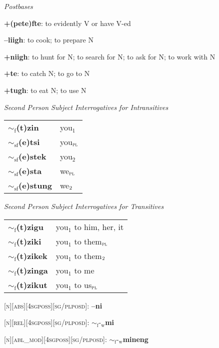 \documentclass{article}
\begin{document}
\textit{Postbases}
\begin{description}
\item \textbf{+(pete)fte}: to evidently V or have V-ed
\item \textbf{--liigh}: to cook; to prepare N
\item \textbf{+niigh}: to hunt for N; to search for N; to ask for N; to work with N
\item \textbf{+te}: to catch N; to go to N
\item \textbf{+tugh}: to eat N; to use N
\end{description}

\bigskip

\textit{Second Person Subject Interrogatives for Intransitives}

\begin{tabular}{ l l }
\textbf{$\sim_\text{f}$(t)zin} & you$_1$\\
\textbf{$\sim_\text{sf}$(e)tsi} & you$_\text{\textsc{pl}}$ \\
\textbf{$\sim_\text{sf}$(e)stek} & you$_2$ \\
\textbf{$\sim_\text{sf}$(e)sta} & we$_\text{\textsc{pl}}$ \\
\textbf{$\sim_\text{sf}$(e)stung} & we$_\text{\textsc{2}}$
\end{tabular}

\bigskip

\textit{Second Person Subject Interrogatives for Transitives}

\begin{tabular}{ l l }
\textbf{$\sim_\text{f}$(t)zigu} & you$_1$ to him, her, it\\
\textbf{$\sim_\text{f}$(t)ziki} & you$_1$ to them$_\text{\textsc{pl}}$ \\
\textbf{$\sim_\text{f}$(t)zikek} & you$_1$ to them$_\text{\textsc{2}}$ \\
\textbf{$\sim_\text{f}$(t)zinga} & you$_1$ to me \\
\textbf{$\sim_\text{f}$(t)zikut} & you$_1$ to us$_\text{\textsc{pl}}$
\end{tabular}

\bigskip

\textsc{[n][abs][4sgposs][sg/plposd]}: \textbf{--ni}

\textsc{[n][rel][4sgposs][sg/plposd]}: \textbf{$\sim_\text{f}\text{-}_\text{w}$mi}

\textsc{[n][abl\_mod][4sgposs][sg/plposd]}: \textbf{$\sim_\text{f}\text{-}_\text{w}$mineng}
\end{document}
